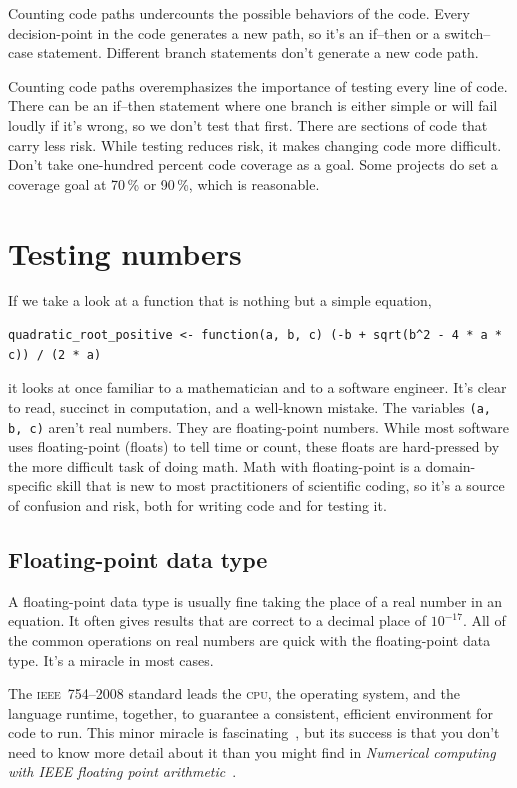 \documentclass[fleqn,10pt]{olplainarticle}
\newcommand{\cpu}{\textsc{cpu}\xspace}
\newcommand{\ieee}{\textsc{ieee}\xspace}
\begin{document}
Counting code paths undercounts the possible behaviors of the code.
Every decision-point in the code generates a new path, so it's an
if--then or a switch--case statement. Different branch statements
don't generate a new code path.

Counting code paths overemphasizes the importance of testing every
line of code. There can be an if--then statement where one branch
is either simple or will fail loudly if it's wrong, so we don't test
that first.
There are sections of code that carry less risk.
While testing reduces risk, it makes changing code more difficult.
Don't take one-hundred percent code coverage as a goal. Some
projects do set a coverage goal at 70\,\% or 90\,\%, which is reasonable.



\section{Testing numbers}\label{sec:ieee-numbers}

If we take a look at a function that is nothing but a simple equation,
\begin{lstlisting}
quadratic_root_positive <- function(a, b, c) (-b + sqrt(b^2 - 4 * a * c)) / (2 * a)
\end{lstlisting}
it looks at once familiar to a mathematician and to a software engineer.
It's clear to read, succinct in computation, and a well-known mistake.
The variables \lstinline|(a, b, c)| aren't real numbers. They are floating-point
numbers. While most software uses floating-point (floats) to tell time
or count, these floats are hard-pressed by the more difficult task of doing
math. Math with floating-point is a domain-specific skill that is new to
most practitioners of scientific coding, so it's a source of confusion and risk,
both for writing code and for testing it.


\subsection{Floating-point data type}

A floating-point data type is usually fine taking the place of a real number
in an equation. It often gives results that are correct to a decimal place
of $10^{-17}.$ All of the common operations on real numbers are quick with
the floating-point data type. It's a miracle in most cases.

The \ieee~754--2008 standard leads the \cpu, the operating system, and 
the language runtime, together, to guarantee a consistent, efficient environment
for code to run. This minor miracle is fascinating~\citep{muller2018handbook},
but its success is that you don't need to know more detail about it than
you might find in \emph{Numerical computing with IEEE floating point arithmetic}~\citep{overton2001numerical,goldberg1991every}.
\end{document}
